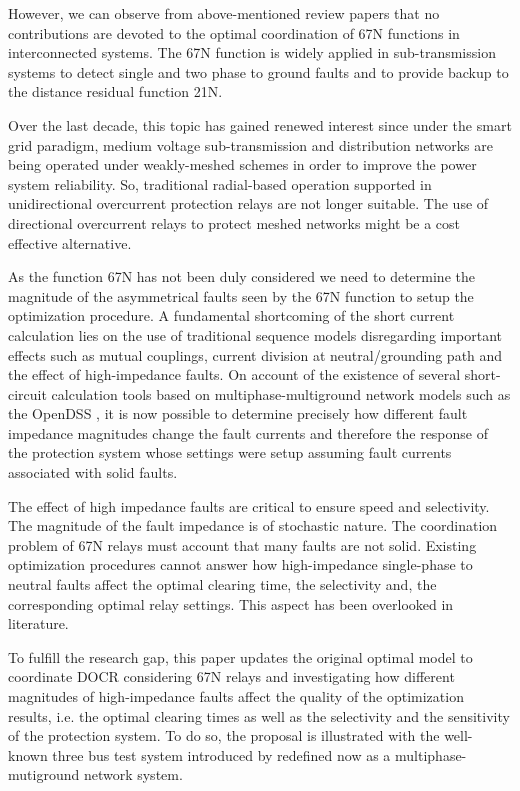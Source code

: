 \documentclass[letterpaper, 10 pt, conference]{IEEEtran}
\begin{document}
However, we can observe from above-mentioned review papers that no contributions are devoted to the optimal coordination of 67N functions in interconnected systems. The 67N function  is widely applied in sub-transmission systems to detect single and two phase to ground faults and to provide backup to the distance residual function 21N.

Over the last decade, this topic has gained renewed interest since under the smart grid paradigm, medium voltage sub-transmission and distribution networks are being operated under weakly-meshed schemes in order to improve the power system reliability. So, traditional radial-based operation supported in unidirectional overcurrent protection relays are not longer suitable. The use of directional overcurrent relays to protect meshed networks might be a cost effective alternative.

As the function 67N has not been duly considered  we need to determine the magnitude of the asymmetrical faults seen by the 67N function to setup the optimization procedure. A fundamental shortcoming of the short current calculation lies on the use of traditional sequence models disregarding important effects such as mutual couplings, current division at neutral/grounding path and the effect of high-impedance faults. On account of the existence of several short-circuit calculation tools based on multiphase-multiground network models such as the OpenDSS \cite{opendss}, it is now possible to determine precisely how different fault impedance magnitudes change the fault currents and therefore the response of the protection system whose settings were setup assuming fault currents associated with solid faults.

The effect of high impedance faults are critical to ensure speed and selectivity. The magnitude of the fault impedance is of stochastic nature. The coordination problem of 67N relays must account that many faults are not solid. Existing optimization procedures cannot answer how high-impedance single-phase to neutral faults affect the optimal clearing time, the selectivity and, the corresponding optimal relay settings. This aspect has been overlooked in literature.

To fulfill the research gap, this paper updates the original optimal model to coordinate DOCR \cite{urdaneta1988} considering  67N relays and investigating how different magnitudes of high-impedance faults affect the quality of the optimization results, i.e. the optimal clearing times as well as the selectivity and the sensitivity of the protection system. To do so, the proposal is illustrated with the well-known three bus test system introduced by \cite{urdaneta1988} redefined now as a multiphase-mutiground network system.
\end{document}
